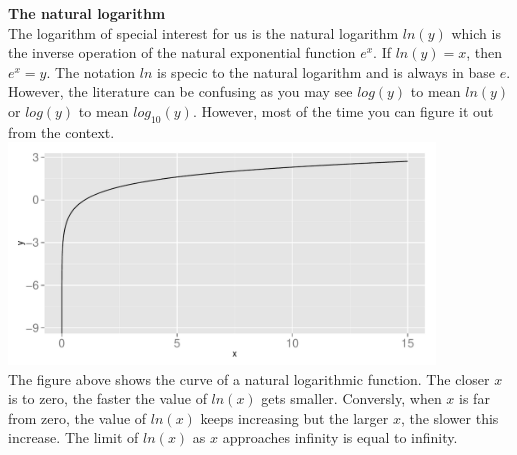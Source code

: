 \documentclass[a4paper]{report}
\begin{document}
\textbf{The natural logarithm}\\
The logarithm of special interest for us is the natural logarithm $ln(y)$ which is the inverse operation of the natural exponential function $e^x$. If $ln(y) = x$, then $e^x = y$. The notation $ln$ is specic to the natural logarithm and is always in base $e$. However, the literature can be confusing as you may see $log(y)$ to mean $ln(y)$ or $log(y)$ to mean $log_{10}(y)$. However, most of the time you can figure it out from the context.\\
\includegraphics[width=0.85\textwidth]{ln_plot.pdf}\\
The figure above shows the curve of a natural logarithmic function. The closer $x$ is to zero, the faster the value of $ln(x)$ gets smaller. Conversly, when $x$ is far from zero, the value of $ln(x)$ keeps increasing but the larger $x$, the slower this increase. The limit of $ln(x)$ as $x$ approaches infinity is equal to infinity.\\
\end{document}
